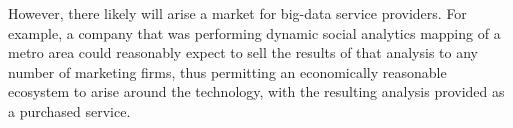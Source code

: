 However, there likely will arise a market for big-data service providers. For example, a company that was performing dynamic social analytics mapping of a metro area could reasonably expect to sell the results of that analysis to any number of marketing firms, thus permitting an economically reasonable ecosystem to arise around the technology, with the resulting analysis provided as a purchased service.
